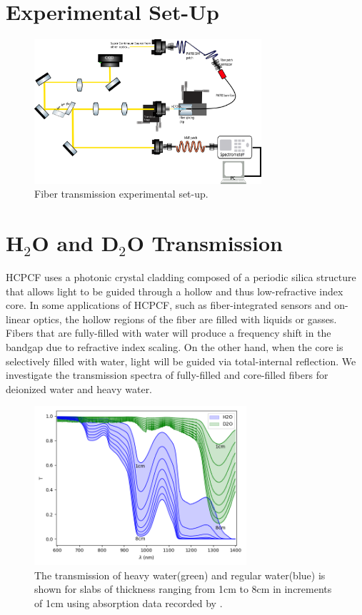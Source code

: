 \section{Experimental Set-Up}
\begin{figure}[!htb]
	\centering
	\includegraphics[width=0.75\textwidth]{./Figures/fiberfilling/Transmission_SetUp.png}
	\caption{Fiber transmission experimental set-up.}
	\label{fig:filling exp}
\end{figure}


\section{H${}_2$O and D${}_2$O Transmission}
HCPCF uses a photonic crystal cladding composed of a periodic silica structure that allows light to be guided through a hollow and thus low-refractive index core.
In some applications of HCPCF, such as fiber-integrated sensors and on-linear optics, the hollow regions of the fiber are filled with liquids or gasses.
Fibers that are fully-filled with water will produce a frequency shift in the bandgap due to refractive index scaling\cite{antonopoulos}. On the other hand, when the core is selectively filled with water, light will be guided via total-internal reflection. We investigate the transmission spectra of fully-filled and core-filled fibers for deionized water and heavy water.
\begin{figure}[!htb]
	\centering
	\includegraphics[width=0.7\textwidth]{./Figures/fiberfilling/water_transmission/water_transmission.png}
	\caption{The transmission of heavy water(green) and regular water(blue) is shown for slabs of thickness ranging from 1cm to 8cm in increments of 1cm using absorption data recorded by \cite{kedenburg}. }
	\label{fig:water transmission}
\end{figure}
\clearpage

